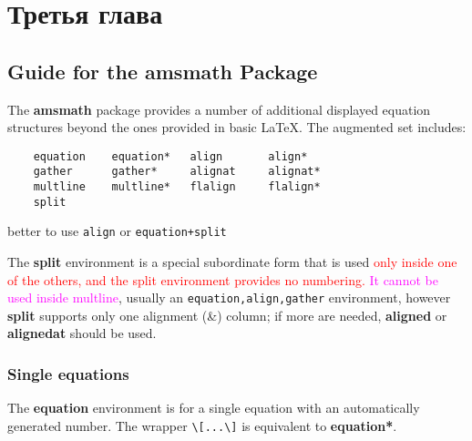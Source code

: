 \chapter{Третья глава}
\label{ch:ch3}

\section{Guide for the amsmath Package}
The \textbf{amsmath} package provides a number of additional displayed equation structures beyond the ones provided in basic \LaTeX. The augmented set includes:
\begin{verbatim}
	equation 	equation* 	align 		align*
	gather 		gather* 	alignat 	alignat*
	multline 	multline* 	flalign 	flalign*
	split
\end{verbatim}

better to use \verb*|align| or \verb*|equation+split|

The \textbf{split} environment is a special subordinate form that is used \textcolor{red}{only inside one of the others, and the split environment provides no numbering.} \textcolor{magenta}{It cannot be used inside multline},  usually an \verb*|equation,align,gather| environment, however \textbf{split} supports only one alignment (\&) column; if more are needed, \textbf{aligned} or \textbf{alignedat} should be used. 

\subsection{Single equations}
The \textbf{equation} environment is for a single equation with an automatically generated number. 
The wrapper \verb*|\[...\]| is equivalent to \textbf{equation*}.

